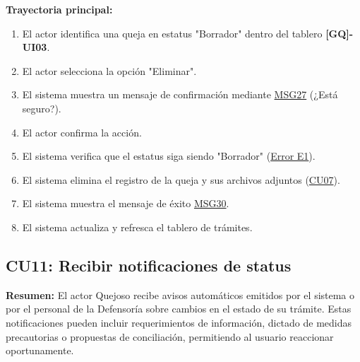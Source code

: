 \begin{appendices}
\textbf{Trayectoria principal:}
\begin{enumerate}[nosep]
    \item El actor identifica una queja en estatus "Borrador" dentro del tablero \textbf{[GQ]-UI03}.
    \item El actor selecciona la opción "Eliminar".
    \item El sistema muestra un mensaje de confirmación mediante \hyperlink{msg:MSG27}{MSG27} (¿Está seguro?).
    \item El actor confirma la acción.
    \item El sistema verifica que el estatus siga siendo "Borrador" (\hyperlink{err:E15}{Error E1}).
    \item El sistema elimina el registro de la queja y sus archivos adjuntos (\hyperlink{anexo:casos_uso}{CU07}).
    \item El sistema muestra el mensaje de éxito \hyperlink{msg:MSG30}{MSG30}.
    \item El sistema actualiza y refresca el tablero de trámites.
\end{enumerate}

\subsection{CU11: Recibir notificaciones de status}

\textbf{Resumen:} 
El actor Quejoso recibe avisos automáticos emitidos por el sistema o por el personal de la Defensoría sobre cambios en el estado de su trámite. Estas notificaciones pueden incluir requerimientos de información, dictado de medidas precautorias o propuestas de conciliación, permitiendo al usuario reaccionar oportunamente.


\end{appendices}
